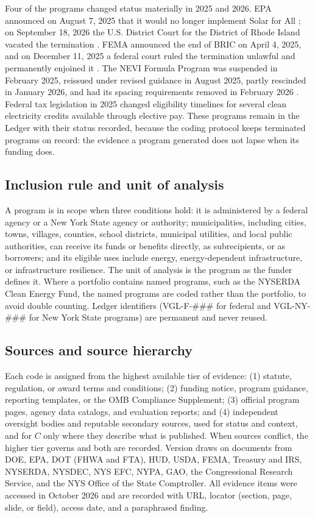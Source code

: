 \documentclass[10pt,twocolumn,letterpaper]{article}
\begin{document}
Four of the \nProg{} programs changed status materially in 2025 and 2026. EPA announced on August 7, 2025 that it would no longer implement Solar for All \cite{epaggrf2026}; on September 18, 2026 the U.S. District Court for the District of Rhode Island vacated the termination \cite{ctmirror2026}. FEMA announced the end of BRIC on April 4, 2025, and on December 11, 2025 a federal court ruled the termination unlawful and permanently enjoined it \cite{crs2026bric}. The NEVI Formula Program was suspended in February 2025, reissued under revised guidance in August 2025, partly rescinded in January 2026, and had its spacing requirements removed in February 2026 \cite{atlas2026nevi}. Federal tax legislation in 2025 changed eligibility timelines for several clean electricity credits available through elective pay. These programs remain in the Ledger with their status recorded, because the coding protocol keeps terminated programs on record: the evidence a program generated does not lapse when its funding does.

\subsection{Inclusion rule and unit of analysis}

A program is in scope when three conditions hold: it is administered by a federal agency or a New York State agency or authority; municipalities, including cities, towns, villages, counties, school districts, municipal utilities, and local public authorities, can receive its funds or benefits directly, as subrecipients, or as borrowers; and its eligible uses include energy, energy-dependent infrastructure, or infrastructure resilience. The unit of analysis is the program as the funder defines it. Where a portfolio contains named programs, such as the NYSERDA Clean Energy Fund, the named programs are coded rather than the portfolio, to avoid double counting. Ledger identifiers (VGL-F-\#\#\# for federal and VGL-NY-\#\#\# for New York State programs) are permanent and never reused.

\subsection{Sources and source hierarchy}

Each code is assigned from the highest available tier of evidence: (1) statute, regulation, or award terms and conditions; (2) funding notice, program guidance, reporting templates, or the OMB Compliance Supplement; (3) official program pages, agency data catalogs, and evaluation reports; and (4) independent oversight bodies and reputable secondary sources, used for status and context, and for $C$ only where they describe what is published. When sources conflict, the higher tier governs and both are recorded. Version \vglVersion{} draws on documents from DOE, EPA, DOT (FHWA and FTA), HUD, USDA, FEMA, Treasury and IRS, NYSERDA, NYSDEC, NYS EFC, NYPA, GAO, the Congressional Research Service, and the NYS Office of the State Comptroller. All \nEvid{} evidence items were accessed in October 2026 and are recorded with URL, locator (section, page, slide, or field), access date, and a paraphrased finding.
\end{document}
